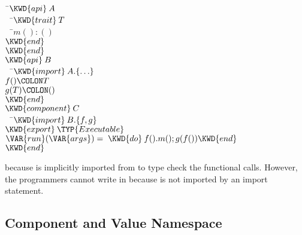
\begin{Fortress}
{\tt~}\pushtabs\=\+\( \KWD{api}\:A\)\\
{\tt~~}\pushtabs\=\+\(   \KWD{trait}\:T\)\\
{\tt~~}\pushtabs\=\+\(     m() \mathrel{\mathtt{:}} ()\)\-\\\poptabs
\(   \KWD{end}\)\-\\\poptabs
\( \KWD{end}\)\\[4pt]
\( \KWD{api}\:B\)\\
{\tt~~}\pushtabs\=\+\(   \KWD{import}\:A.\{\ldots\}\)\\
\(   f()\COLON T\)\\
\(   g(T)\COLON ()\)\-\\\poptabs
\( \KWD{end}\)\\[4pt]
\( \KWD{component}\:C\)\\
{\tt~~}\pushtabs\=\+\(   \KWD{import}\:B.\{f, g\}\)\\
\(   \KWD{export}\:\TYP{Executable}\)\\
\(   \VAR{run} (\VAR{args}) = \;\KWD{do}\:f().m(); g(f()) \KWD{end}\)\-\\\poptabs
\( \KWD{end}\)\-\\\poptabs
\end{Fortress}
because  is implicitly imported from  to type check the functional calls.
However, the programmers cannot write  in 
because  is not imported by an import statement.

\subsection{Component and Value Namespace}



